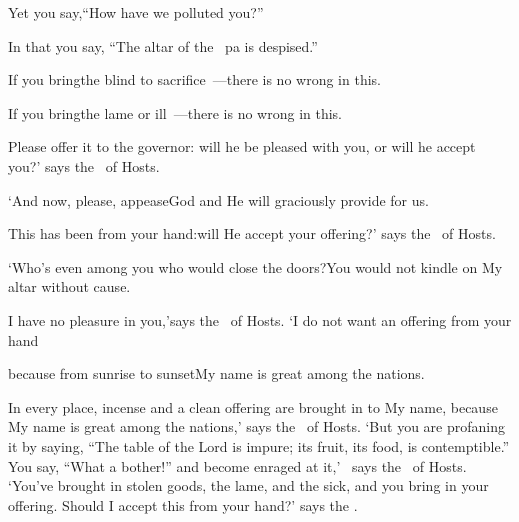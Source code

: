 \begin{inparaenum}
  \pc Yet you say,\pa ``How have we polluted you?''%
  
  \pc In that you say,%
  ``The altar of the \lord\ pa is despised.''%
  
  \pb {} If you bring\pa the blind to sacrifice~---\pa there is no wrong in this.%
  
  \pc If you bring\pa the lame or ill~---\pa there is no wrong in this.%
  
  \pc Please offer it to the governor:%
  \pa will he be pleased with you, or will he accept you?'%
  \pa says the \lord\ of Hosts.%
  
  \pb {} `And now, please, appease\pa God and He will graciously provide for us.%
  
  \pc This has been from your hand:\pa will He accept your offering?'%
  \pa says the \lord\ of Hosts.%
  
  \pb {} `Who's even among you who would close the doors?\pa You would not kindle on My altar without cause.%
  
  \pc I have no pleasure in you,'\pa says the \lord\ of Hosts.%
  \pa `I do not want an offering from your hand%
  
  \pb {}%
  because from sunrise to sunset\pa My name is great among the nations.\smallskip%
  
  \noindent In every place, incense and a clean%
  offering are brought in to My name, because My name is great among the nations,' says the \lord\ of Hosts.%
   `But you are profaning it by saying, ``The table of the Lord is impure; its fruit, its food, is contemptible.''%
   You say, ``What a bother!'' and become enraged at it,'\
  says the \lord\ of Hosts. `You've brought in stolen goods, the lame, and the sick, and you bring in your offering. Should I accept this from your hand?' says the \lord.\
  

\end{inparaenum}
